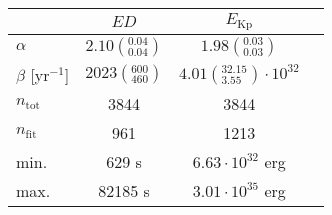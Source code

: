 \begin{tabular}{lccr}
\hline
  &                               $ED$ &                                  $E_\mathrm{Kp}$ \\
\hline
$\alpha$            &  $2.10\left(^{0.04}_{0.04}\right)$ &                $1.98\left(^{0.03}_{0.03}\right)$ \\
$\beta$ [yr$^{-1}$] &    $2023\left(^{600}_{460}\right)$ &  $4.01\left(^{32.15}_{3.55}\right)\cdot 10^{32}$ \\
$n_\mathrm{tot}$    &                               3844 &                                             3844 \\
$n_\mathrm{fit}$    &                                961 &                                             1213 \\
min.                &                              629 s &                          $6.63\cdot 10^{32}$ erg \\
max.                &                            82185 s &                          $3.01\cdot 10^{35}$ erg \\
\hline

\end{tabular}
